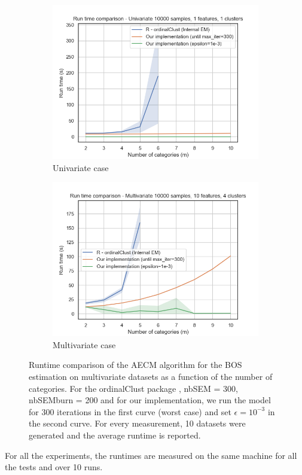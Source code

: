 \begin{figure}[H]
    \centering
    \begin{subfigure}[b]{0.49\textwidth}
    \includegraphics[width=1\textwidth]{python_figures/run_time_comparison_univariate_epsilon.png}
        \caption{Univariate case}
    \label{fig:runtime_univariate_epsilon}
    \end{subfigure}
    \hfill
    \begin{subfigure}[b]{0.49\textwidth}
    \includegraphics[width=1\textwidth]{python_figures/run_time_comparison_multivariate_epsilon.png}
        \caption{Multivariate case}
    \label{fig:runtime_multivariate_epsilon}
    \end{subfigure}
    \caption{Runtime comparison of the AECM algorithm for the BOS estimation on multivariate datasets as a function of the number of categories. For the ordinalClust package \cite{selosse2021ordinalclust}, nbSEM = 300, nbSEMburn = 200 and for our implementation, we run the model for $300$ iterations in the first curve (worst case) and set $\epsilon = 10^{-3}$ in the second curve. For every measurement, 10 datasets were generated and the average runtime is reported.}
    \label{fig:runtime_epsilon}
\end{figure}
For all the experiments, the runtimes are measured on the same machine for all the tests and over 10 runs.

